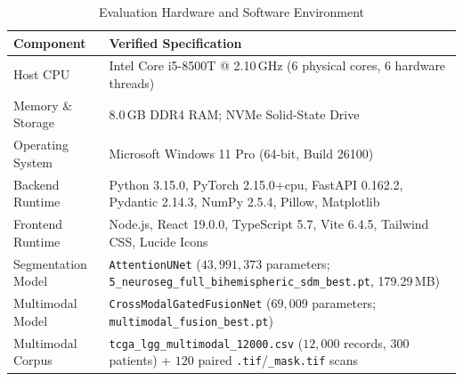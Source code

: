\documentclass[journal,onecolumn,10pt]{IEEEtran}
\begin{document}
\begin{table}[t]
\centering
\caption{Evaluation Hardware and Software Environment}
\label{tab:env}
\begin{tabular}{@{}L{2.35cm}L{5.95cm}@{}}
\toprule
\textbf{Component} & \textbf{Verified Specification} \\
\midrule
Host CPU & Intel Core i5-8500T @ 2.10\,GHz (6 physical cores, 6 hardware threads) \\
Memory \& Storage & 8.0\,GB DDR4 RAM; NVMe Solid-State Drive \\
Operating System & Microsoft Windows 11 Pro (64-bit, Build 26100) \\
Backend Runtime & Python 3.15.0, PyTorch 2.15.0+cpu, FastAPI 0.162.2, Pydantic 2.14.3, NumPy 2.5.4, Pillow, Matplotlib \\
Frontend Runtime & Node.js, React 19.0.0, TypeScript 5.7, Vite 6.4.5, Tailwind CSS, Lucide Icons \\
Segmentation Model & \texttt{AttentionUNet} ($43,991,373$ parameters; \texttt{5\_neuroseg\_full\_bihemispheric\_sdm\_best.pt}, 179.29\,MB) \\
Multimodal Model & \texttt{CrossModalGatedFusionNet} ($69,009$ parameters; \texttt{multimodal\_fusion\_best.pt}) \\
Multimodal Corpus & \texttt{tcga\_lgg\_multimodal\_12000.csv} ($12,000$ records, $300$ patients) + $120$ paired \texttt{.tif}/\texttt{\_mask.tif} scans \\
\bottomrule
\end{tabular}
\end{table}
\end{document}
